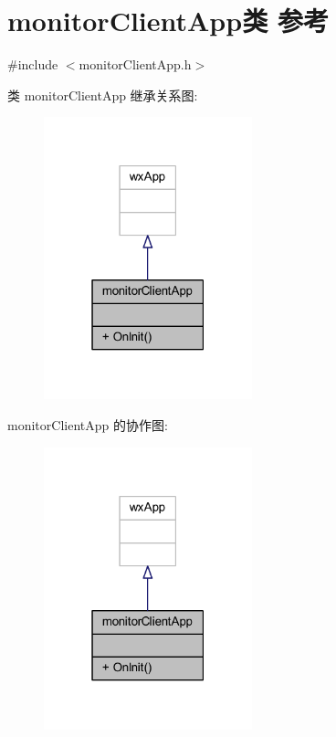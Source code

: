 \hypertarget{classmonitor_client_app}{}\section{monitor\+Client\+App类 参考}
\label{classmonitor_client_app}


{\ttfamily \#include $<$monitor\+Client\+App.\+h$>$}



类 monitor\+Client\+App 继承关系图\+:\nopagebreak
\begin{figure}[H]
\begin{center}
\leavevmode
\includegraphics[width=171pt]{classmonitor_client_app__inherit__graph}
\end{center}
\end{figure}


monitor\+Client\+App 的协作图\+:\nopagebreak
\begin{figure}[H]
\begin{center}
\leavevmode
\includegraphics[width=171pt]{classmonitor_client_app__coll__graph}
\end{center}
\end{figure}
